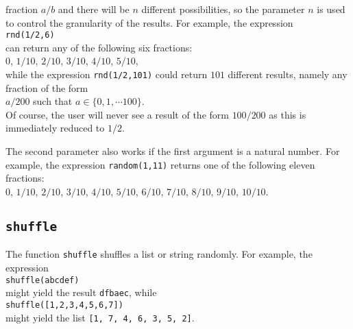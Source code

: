\begin{enumerate}
      fraction $a/b$ and there will be $n$ different possibilities, so the parameter $n$ is used to
      control the granularity of the results.  For example,  the expression 
      \\[0.2cm]
      \hspace*{1.3cm}
      \texttt{rnd(1/2,6)}
      \\[0.2cm]
      can return any of the following six fractions:
      \\[0.2cm]
      \hspace*{1.3cm}
      $0$, $1/10$, $2/10$, $3/10$, $4/10$, $5/10$,
      \\[0.2cm]
      while the expression \texttt{rnd(1/2,101)} could return $101$ different results, namely any
      fraction of the form
      \\[0.2cm]
      \hspace*{1.3cm}
      $a/200$ \quad such that $a \in \{0, 1, \cdots 100\}$.
      \\[0.2cm]
      Of course, the user will never see a result of the form $100/200$ as this is immediately
      reduced to $1/2$. 

      The second parameter also works if the first argument is a natural number.  For example, the
      expression \texttt{random(1,11)} returns one of the following eleven fractions:
      \\[0.2cm]
      \hspace*{1.3cm}
      $0$, $1/10$, $2/10$, $3/10$, $4/10$, $5/10$,
      $6/10$, $7/10$, $8/10$, $9/10$, $10/10$.      
\end{enumerate}

\subsection{\texttt{shuffle}}
The function \texttt{shuffle} shuffles a list or string
randomly.  For example, the expression
\\[0.2cm]
\hspace*{1.3cm}
\texttt{shuffle(abcdef)}
\\[0.2cm]
might yield the result \texttt{dfbaec}, while 
\\[0.2cm]
\hspace*{1.3cm}
\texttt{shuffle([1,2,3,4,5,6,7])}
\\[0.2cm]
might yield the list \texttt{[1, 7, 4, 6, 3, 5, 2]}.

